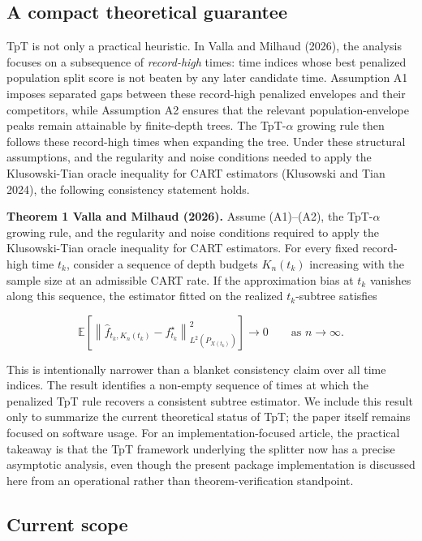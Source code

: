 \documentclass[
]{article}
\begin{document}
\subsection{A compact theoretical
guarantee}\label{a-compact-theoretical-guarantee}

TpT is not only a practical heuristic. In Valla and Milhaud (2026), the
analysis focuses on a subsequence of \emph{record-high} times: time
indices whose best penalized population split score is not beaten by any
later candidate time. Assumption A1 imposes separated gaps between these
record-high penalized envelopes and their competitors, while Assumption
A2 ensures that the relevant population-envelope peaks remain attainable
by finite-depth trees. The TpT-\(\alpha\) growing rule then follows
these record-high times when expanding the tree. Under these structural
assumptions, and the regularity and noise conditions needed to apply the
Klusowski-Tian oracle inequality for CART estimators (Klusowski and Tian
2024), the following consistency statement holds.

\textbf{Theorem 1 Valla and Milhaud (2026).} Assume (A1)--(A2), the
TpT-\(\alpha\) growing rule, and the regularity and noise conditions
required to apply the Klusowski-Tian oracle inequality for CART
estimators. For every fixed record-high time \(t_k\), consider a
sequence of depth budgets \(K_n(t_k)\) increasing with the sample size
at an admissible CART rate. If the approximation bias at \(t_k\)
vanishes along this sequence, the estimator fitted on the realized
\(t_k\)-subtree satisfies

\[
\mathbb{E}\!\left[\left\lVert \hat f_{t_k, K_n(t_k)} - f_{t_k}^{\star} \right\rVert^2_{L^2(P_{X(t_k)})}\right]
\longrightarrow 0
\qquad \text{as } n \to \infty.
\]

This is intentionally narrower than a blanket consistency claim over all
time indices. The result identifies a non-empty sequence of times at
which the penalized TpT rule recovers a consistent subtree estimator. We
include this result only to summarize the current theoretical status of
TpT; the paper itself remains focused on software usage. For an
implementation-focused article, the practical takeaway is that the TpT
framework underlying the splitter now has a precise asymptotic analysis,
even though the present package implementation is discussed here from an
operational rather than theorem-verification standpoint.

\subsection{Current scope}\label{current-scope}
\end{document}

